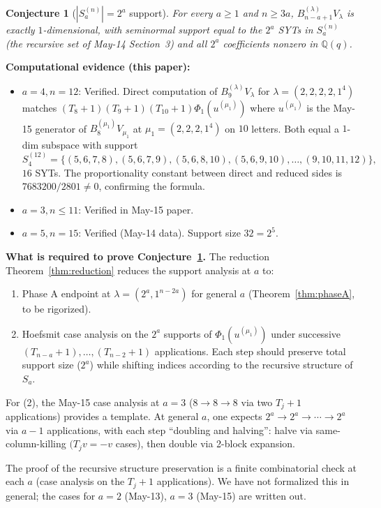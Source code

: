 \documentclass[11pt]{article}
\newtheorem{conjecture}[theorem]{Conjecture}
\theoremstyle{definition}
\begin{document}
\begin{conjecture}[$|S_a^{(n)}|=2^a$ support]\label{conj:S_a}
For every $a\ge 1$ and $n\ge 3a$, $B_{n-a+1}^{(\lambda)} V_\lambda$
is exactly $1$-dimensional, with seminormal support equal to the
$2^a$ SYTs in $S_a^{(n)}$ (the recursive set of May-14
Section~3) and all $2^a$ coefficients nonzero in $\mathbb{Q}(q)$.
\end{conjecture}

\textbf{Computational evidence (this paper):}
\begin{itemize}[leftmargin=2em,topsep=0.3em,itemsep=0.2em]
\item $a=4,n=12$: Verified.  Direct computation of
$B_9^{(\lambda)} V_\lambda$ for $\lambda=(2,2,2,2,1^4)$ matches
$(T_8{+}1)(T_9{+}1)(T_{10}{+}1)\Phi_1(u^{(\mu_1)})$ where
$u^{(\mu_1)}$ is the May-15 generator of $B_8^{(\mu_1)} V_{\mu_1}$
at $\mu_1=(2,2,2,1^4)$ on $10$ letters.  Both equal a $1$-dim
subspace with support
\[
   S_4^{(12)}=\{(5,6,7,8),(5,6,7,9),(5,6,8,10),(5,6,9,10),\ldots,
   (9,10,11,12)\},
\]
$16$ SYTs.  The proportionality constant between direct and
reduced sides is $7683200/2801\ne 0$, confirming the formula.
\item $a=3,n\le 11$: Verified in May-15 paper.
\item $a=5,n=15$: Verified (May-14 data).  Support size $32=2^5$.
\end{itemize}

\textbf{What is required to prove Conjecture~\ref{conj:S_a}.}
The reduction Theorem~\ref{thm:reduction} reduces the support
analysis at $a$ to:
\begin{enumerate}[leftmargin=2em,topsep=0.3em,itemsep=0.2em]
\item Phase A endpoint at $\lambda=(2^a,1^{n-2a})$ for general $a$
(Theorem~\ref{thm:phaseA}, to be rigorized).
\item Hoefsmit case analysis on the $2^a$ supports of
$\Phi_1(u^{(\mu_1)})$ under successive
$(T_{n-a}{+}1),\ldots,(T_{n-2}{+}1)$ applications.  Each step
should preserve total support size ($2^a$) while shifting indices
according to the recursive structure of $S_a$.
\end{enumerate}
For (2), the May-15 case analysis at $a=3$ ($8\to 8\to 8$ via two
$T_j{+}1$ applications) provides a template.  At general $a$, one
expects $2^a\to 2^a\to\cdots\to 2^a$ via $a-1$ applications, with
each step ``doubling and halving'': halve via same-column-killing
$(T_j v=-v$ cases), then double via 2-block expansion.

The proof of the recursive structure preservation is a finite
combinatorial check at each $a$ (case analysis on the $T_j{+}1$
applications).  We have not formalized this in general; the cases
for $a=2$ (May-13), $a=3$ (May-15) are written out.
\end{document}
